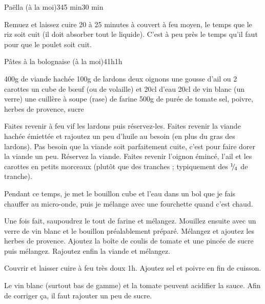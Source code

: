 \begin{recette}{Paëlla (à la moi)}{3}{45 min}{30 min}
\begin{cuisson}
Remuez et laissez cuire 20 à 25 minutes à couvert à feu moyen, le temps que le riz soit cuit (il doit absorber tout le liquide). C'est à peu près le temps qu'il faut pour que le poulet soit cuit. 
\end{cuisson}


\end{recette}

\begin{recette}{Pâtes à la bolognaise (à la moi)}{4}{1h}{1h}
\begin{ingredients}
\ingredient 400g de viande hachée
\ingredient 100g de lardons
\ingredient deux oignons
\ingredient une gousse d'ail
 ou 2 carottes
\ingredient un cube de bœuf (ou de volaille) et 20cl d'eau
\ingredient 20cl de vin blanc (un verre)
\ingredient une cuillère à soupe (rase) de farine
\ingredient 500g de purée de tomate
\ingredient sel, poivre, herbes de provence, sucre
\end{ingredients}

\begin{preparation}
\etape Faites revenir à feu vif les lardons puis réservez-les.
\etape Faites revenir la viande hachée émiettée et rajoutez un peu d'huile au besoin (en plus du gras des lardons). Pas besoin que la viande soit parfaitement cuite, c'est pour faire dorer la viande un peu.
\etape Réservez la viande.
\etape Faites revenir l'oignon émincé, l'ail et les carottes en petits morceaux (plutôt que des tranches ; typiquement des ${{}^{1\!\!}/ _{\!4}}$ de tranche).
\begin{remarque}
Pendant ce temps, je met le bouillon cube et l'eau dans un bol que je fais chauffer au micro-onde, puis je mélange avec une fourchette quand c'est chaud.
\end{remarque}
\etape Une fois fait, saupoudrez le tout de farine et mélangez. Mouillez ensuite avec un verre de vin blanc et le bouillon préalablement préparé. Mélangez et ajoutez les herbes de provence.
\etape Ajoutez la boîte de coulis de tomate et une pincée de sucre puis mélangez.
\etape Rajoutez enfin la viande et mélangez.
\end{preparation}

\begin{cuisson}
Couvrir et laisser cuire à feu très doux 1h. Ajoutez sel et poivre en fin de cuisson.
\begin{remarque}
Le vin blanc (surtout bas de gamme) et la tomate peuvent acidifier la sauce. Afin de corriger ça, il faut rajouter un peu de sucre.
\end{remarque}
\end{cuisson}
\end{recette}

